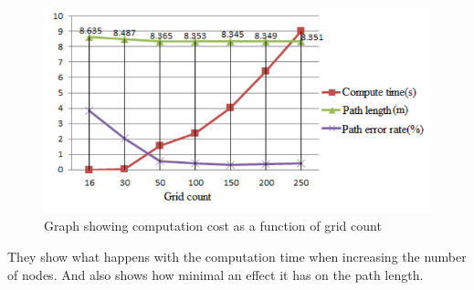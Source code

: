 \begin{figure}[H]
    \centering
    \includegraphics[width=1\textwidth]{fig/graph_grid_system.PNG}
    \caption{Graph showing computation cost as a function of grid count~\cite{xu2017bim}}
    \label{}
\end{figure}

They show what happens with the computation time when increasing the number of nodes. And also shows how minimal an effect it has on the path length.